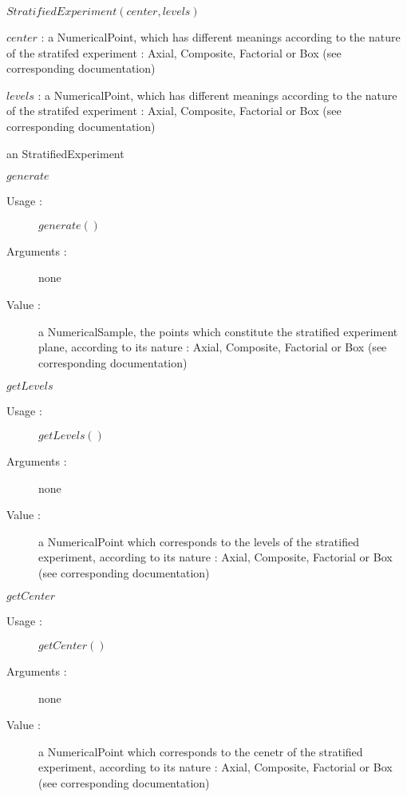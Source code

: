 \begin{description}

\item[Usage :] $StratifiedExperiment(center, levels)$

\item[Arguments :]   \rule{0pt}{1em}
  \begin{description}
  \item $center$ : a NumericalPoint, which has different meanings according to the nature of the stratifed experiment : Axial, Composite, Factorial or Box (see corresponding documentation)
  \item $levels$ :  a NumericalPoint, which has different meanings according to the nature of the stratifed experiment : Axial, Composite, Factorial or Box (see corresponding documentation)
  \end{description}

\item[Value :] an StratifiedExperiment

\item[Some methods :]  \rule{0pt}{1em}

  \begin{description}

  \item $generate$
    \begin{description}
    \item[Usage :] $generate()$
    \item[Arguments :] none
    \item[Value :] a NumericalSample, the points which constitute the stratified experiment plane, according to its nature  : Axial, Composite, Factorial or Box (see corresponding documentation)
    \end{description}
    \bigskip

  \item $getLevels$
    \begin{description}
    \item[Usage :] $getLevels()$
    \item[Arguments :] none
    \item[Value :] a NumericalPoint which corresponds to the levels of the stratified experiment, according to its nature : Axial, Composite, Factorial or Box (see corresponding documentation)
    \end{description}
    \bigskip

  \item $getCenter$
    \begin{description}
    \item[Usage :] $getCenter()$
    \item[Arguments :] none
    \item[Value :] a NumericalPoint which corresponds to the cenetr of the stratified experiment, according to its nature : Axial, Composite, Factorial or Box (see corresponding documentation)
    \end{description}
    \bigskip


\end{description}
\end{description}

